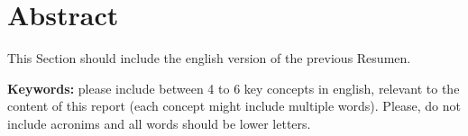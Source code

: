 \chapter{Abstract}
This Section should include the english version of the previous Resumen.

\vspace{0.5cm}
{\bf Keywords:} please include between 4 to 6 key concepts in english, relevant to the content of this report (each concept might include multiple words). Please, do not include acronims and all words should be lower letters.

